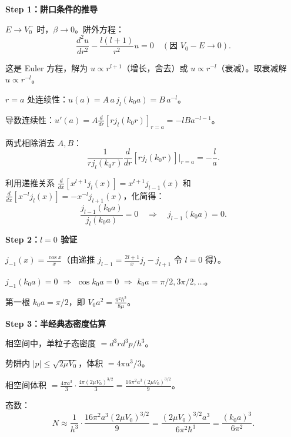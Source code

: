 \begin{derivationbox}
\textbf{Step 1：阱口条件的推导}

$E\to V_0^-$ 时，$\beta\to0$。阱外方程：
\[
\frac{d^2u}{dr^2}-\frac{l(l+1)}{r^2}u=0\quad(\text{因 }V_0-E\to0).
\]

这是 Euler 方程，解为 $u\propto r^{l+1}$（增长，舍去）或 $u\propto r^{-l}$（衰减）。取衰减解 $u\propto r^{-l}$。

$r=a$ 处连续性：$u(a)=A\,a\,j_l(k_0a)=B\,a^{-l}$。

导数连续性：$u'(a)=A\frac{d}{dr}[r j_l(k_0r)]_{r=a}=-lB a^{-l-1}$。

两式相除消去 $A,B$：
\[
\frac{1}{r j_l(k_0r)}\frac{d}{dr}[r j_l(k_0r)]\bigg|_{r=a}=-\frac{l}{a}.
\]

利用递推关系 $\frac{d}{dx}[x^{l+1}j_l(x)]=x^{l+1}j_{l-1}(x)$ 和 $\frac{d}{dx}[x^{-l}j_l(x)]=-x^{-l}j_{l+1}(x)$，化简得：
\[
\frac{j_{l-1}(k_0a)}{j_l(k_0a)}=0\quad\Rightarrow\quad j_{l-1}(k_0a)=0.
\]

\textbf{Step 2：$l=0$ 验证}

$j_{-1}(x)=\frac{\cos x}{x}$（由递推 $j_{l-1}=\frac{2l+1}{x}j_l-j_{l+1}$ 令 $l=0$ 得）。

$j_{-1}(k_0a)=0$ $\Rightarrow$ $\cos k_0a=0$ $\Rightarrow$ $k_0a=\pi/2,3\pi/2,\ldots$。

第一根 $k_0a=\pi/2$，即 $V_0a^2=\frac{\pi^2\hbar^2}{8\mu}$。

\textbf{Step 3：半经典态密度估算}

相空间中，单粒子态密度 $=d^3rd^3p/h^3$。

势阱内 $|p|\leq\sqrt{2\mu V_0}$，体积 $=4\pi a^3/3$。

相空间体积 $=\frac{4\pi a^3}{3}\cdot\frac{4\pi(2\mu V_0)^{3/2}}{3}=\frac{16\pi^2a^3(2\mu V_0)^{3/2}}{9}$。

态数：
\[
N\approx\frac{1}{h^3}\cdot\frac{16\pi^2a^3(2\mu V_0)^{3/2}}{9}=\frac{(2\mu V_0)^{3/2}a^3}{6\pi^2\hbar^3}=\frac{(k_0a)^3}{6\pi^2}.
\]
\end{derivationbox}

\vspace{1em}
